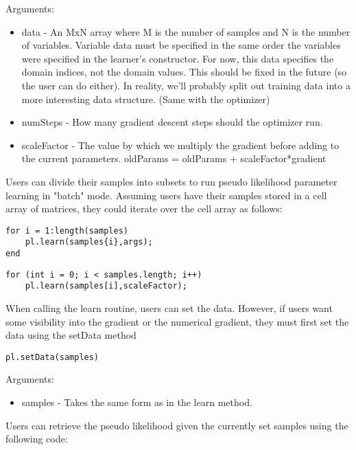 Arguments:
\begin{itemize}
\item data - An MxN array where M is the number of samples and N is the number of variables.  Variable data must be specified in the same order the variables were specified in the learner's constructor.  For now, this data specifies the domain indices, not the domain values.  This should be fixed in the future (so the user can do either).  In reality, we'll probably split out training data into a more interesting data structure.  (Same with the optimizer) 
\item numSteps - How many gradient descent steps should the optimizer run. 
\item scaleFactor - The value by which we multiply the gradient before adding to the current parameters.  oldParams = oldParams + scaleFactor*gradient
\end{itemize}

\fi

Users can divide their samples into subsets to run pseudo likelihood parameter learning in "batch" mode.  Assuming users have their samples stored in a \ifmatlab cell \fi array of matrices, they could iterate over the \ifmatlab cell \fi array as follows:

\ifmatlab
\begin{lstlisting}
for i = 1:length(samples)
    pl.learn(samples{i},args);
end
\end{lstlisting}
\fi

\ifjava
\begin{lstlisting}
for (int i = 0; i < samples.length; i++)
    pl.learn(samples[i],scaleFactor);
\end{lstlisting}
\fi

When calling the learn routine, users can set the data.  However, if users want some visibility into the gradient or the numerical gradient, they must first set the data using the setData method

\begin{lstlisting}
pl.setData(samples)
\end{lstlisting}

Arguments:
\begin{itemize}
\item samples - Takes the same form as in the learn method.
\end{itemize}

Users can retrieve the pseudo likelihood given the currently set samples using the following code:

